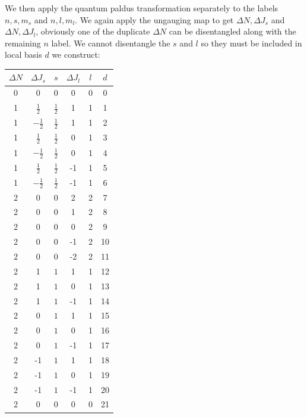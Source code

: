 \documentclass{article}
\begin{document}
We then apply the quantum paldus transformation separately to the labels $n,s,m_s$ and $n,l,m_l$. We again apply the ungauging map to get $\Delta N,\Delta J_s$ and $\Delta N, \Delta J_l$, obviously one of the duplicate $\Delta N$ can be disentangled along with the remaining $n$ label. We cannot disentangle the $s$ and $l$ so they must be included in local basis $d$ we construct:

       \begin{tabular}{|c|c|c|c|c|c|}
       \hline
           $\Delta N$ &$\Delta J_s$& $s$ &$\Delta J_l$&$l$&$d$ \\ \hline
           0 & 0& 0&0&0&0 \\\hline
           1 & $\frac{1}{2}$& $\frac{1}{2}$&1&1&1 \\\hline
           1 & $-\frac{1}{2}$& $\frac{1}{2}$&1&1&2 \\\hline
           1 & $\frac{1}{2}$& $\frac{1}{2}$&0&1&3 \\\hline
           1 & $-\frac{1}{2}$& $\frac{1}{2}$&0&1&4 \\\hline
           1 & $\frac{1}{2}$& $\frac{1}{2}$&-1&1&5 \\\hline
           1 & $-\frac{1}{2}$& $\frac{1}{2}$&-1&1&6 \\\hline
           2 & $0$& $0$&2&2&7 \\\hline
           2 & $0$& $0$&1&2&8 \\\hline
           2 & $0$& $0$&0&2&9 \\\hline
           2 & $0$& $0$&-1&2&10 \\\hline
           2 & $0$& $0$&-2&2&11 \\\hline
           2 & 1& $1$&1&1&12 \\\hline
           2 & 1& $1$&0&1&13 \\\hline
           2 & 1& $1$&-1&1&14 \\\hline
           2 & 0& $1$&1&1&15 \\\hline
           2 & 0& $1$&0&1&16 \\\hline
           2 & 0& $1$&-1&1&17 \\\hline
           2 & -1& $1$&1&1&18 \\\hline
           2 & -1& $1$&0&1&19 \\\hline
           2 & -1& $1$&-1&1&20 \\\hline
           2 & 0& 0&0&0&21 \\\hline
           
           \end{tabular}
\end{document}
